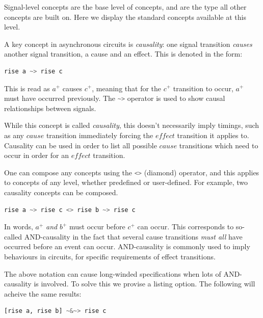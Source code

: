 \documentclass[british,conference,compsoc]{IEEEtran}
\begin{document}
Signal-level concepts are the base level of concepts, and are 
the type all other concepts are built on. Here we display the standard concepts
available at this level.

A key concept in asynchronous circuits is \emph{causality}:
one signal transition \emph{causes} another signal transition, a cause and an 
effect. This is denoted in the form: 

\begin{lstlisting}[language=haskell]
	         rise a ~> rise c
\end{lstlisting}

\vspace{-1mm}

This is read as $a^{+}$ causes $c^{+}$, meaning that for the $c^{+}$ transition 
to occur, $a^{+}$ must have occurred previously. The 
\lstinline[language=haskell]{~>}
operator is used to show causal relationships between signals.
 
While this concept is called \emph{causality}, this doesn't necessarily imply
timings, such as any $\mathit{cause}$ transition immediately forcing the
 $\mathit{effect}$ transition it applies to. Causality can be used in order to
list all possible $\mathit{cause}$ transitions which need to occur in order
 for an $\mathit{effect}$ transition.

One can compose any concepts using the \lstinline[language=haskell]{<>} 
(diamond) operator, and this applies
to concepts of any level, whether predefined or user-defined. For example, 
two causality concepts can be composed.

\begin{lstlisting}[language=haskell]
       rise a ~> rise c <> rise b ~> rise c
\end{lstlisting}

In words, $a^{+}$ \emph{and} $b^{+}$ must occur before $c^{+}$ can occur. 
This corresponds to so-called AND-causality in the fact that several cause 
transitions \emph{must all} have occurred before an event can occur. 
AND-causality is commonly used to imply behaviours in circuits, for specific 
requirements of effect transitions.  

The above notation can cause long-winded specifications when lots of 
AND-causality is involved. To solve this we provise a listing option. The 
following will acheive the same results:

\begin{lstlisting}[language=haskell]
            [rise a, rise b] ~&~> rise c
\end{lstlisting}
\end{document}

